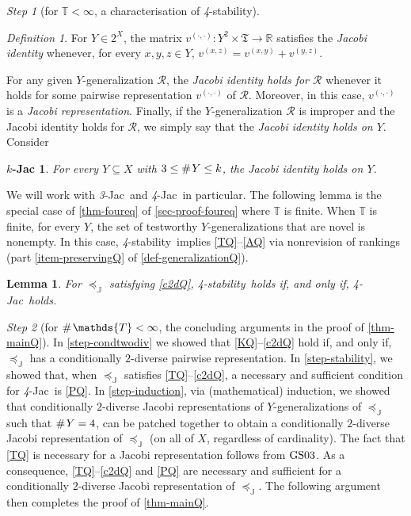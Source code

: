 \documentclass[ecta,nameyear,draft]{econsocart}
\newcommand{\countof}{\mathbin{\#}\hskip1pt}
\newcommand{\R}{\mathbb R}
\newcommand{\mc}{\mathcal}
\newcommand{\ext}{\mathrel{\mc R}}
\newcommand{\mbbt}{{\mathds {T}}}
\newcommand{\mbbtpp}{{\mathfrak{T}}}
\newcommand{\mbbj}{\mathds J}
\newcommand{\xy}{{(x, y)}}
\newcommand{\yz}{{(y,z)}}
\newcommand{\xz}{{(x,z)}}
\newcommand{\dd}{{(\cdot,\cdot)}}
\newcommand{\stability}{\textit{4}-\textup{{stability}}}
\newcommand{\fourjac}{\textup{\textit{4}-Jac}}
\newcommand{\threejac}{\textup{\textit{3}-Jac}}
\newcommand{\gsii}{$\textup{GS03}$}
\theoremstyle{plain}
\newtheorem{lemma}{Lemma}[theorem]
\newtheorem*{k-jac*}{$k$-Jac}
\theoremstyle{remark}
\newtheorem{step}{Step}[section]
\newtheorem*{definition*}{Definition}
\begin{document}
\begin{appendix}
\begin{step}[for $\mbbt<\infty$, a characterisation of
    \stability]
\begin{definition*}
    For $Y \in 2^{X}$, the matrix
    $v^{\dd} : Y^{2}\times \mbbtpp \rightarrow \R$ satisfies the \emph{Jacobi
      identity} whenever, for every $x , y , z \in Y$,
    $v^{\xz} = v^{\xy} + v^{\yz}$.
  \end{definition*}
  For any given $Y$-{generalization} $\ext$, the \emph{Jacobi identity holds for
    $\ext$} whenever it holds for some pairwise representation $v^{\dd}$ of
  $\ext$. Moreover, in this case, $v^{\dd}$ is a \emph{Jacobi
    representation}. Finally, if the $Y$-{generalization} $\ext$ is improper and the
  Jacobi identity holds for $\ext$, we simply say that the \emph{Jacobi identity
    holds on $Y$}.  Consider
  \begin{k-jac*}
  
    For every $Y \subseteq X$ with $3 \leq \countof Y \leq k$, the Jacobi
    identity holds on $Y$.
     
  \end{k-jac*}
  We will work with \threejac\ and \fourjac\ in particular. The following lemma is
  the special case of \cref{thm-foureq} of \cref{sec-proof-foureq} where $\mbbt$
  is finite. When $\mbbt$ is finite, for every $Y$, the set of testworthy
  $Y$-{generalization}s that are novel is nonempty. In this case, \stability\ implies
  \ref{TQ}--\ref{AQ} via nonrevision of rankings (part \ref{item-preservingQ}  of
  \cref{def-generalizationQ}).
   \begin{lemma}\label{lem-foureq}
     For $\preceq_{\mbbj}$ satisfying \ref{c2dQ}, \stability\ holds if, and only if,
     \fourjac\ holds.
   \end{lemma}
   \end{step}
  \setcounter{step}{3}
  
  \begin{step}[for $\countof \mbbt < \infty$, the concluding arguments in the
    proof of
    \cref{thm-mainQ}]\label{step-conc-mainQ} In \cref{step-condtwodiv} we showed
    that \ref{KQ}–\ref{c2dQ} hold if, and only if, $\preceq_{\mbbj}$ has a
    conditionally $2$-diverse pairwise representation.  In \cref{step-stability},
    we showed that, when $\preceq_{\mbbj}$ satisfies \ref{TQ}–\ref{c2dQ}, a
    necessary and sufficient condition for \fourjac\ is \ref{PQ}.  In
    \cref{step-induction}, via (mathematical) induction, we showed that
    conditionally $2$-diverse Jacobi representations of $Y$-{generalization}s of
    $\preceq_{\mbbj}$ such that $\countof Y = 4$, can be patched together to
    obtain a conditionally $2$-diverse Jacobi representation of $\preceq_{\mbbj}$
    (on all of $X$, regardless of cardinality). The fact that \ref{TQ} is
    necessary for a Jacobi representation follows from \gsii.  As a consequence,
    \ref{TQ}–\ref{c2dQ} and \ref{PQ} are necessary and sufficient for a
    conditionally $2$-diverse Jacobi representation of $\preceq_{\mbbj}$. The
    following argument then completes the proof of \cref{thm-mainQ}.
  

\end{step}
\end{appendix}
\end{document}
